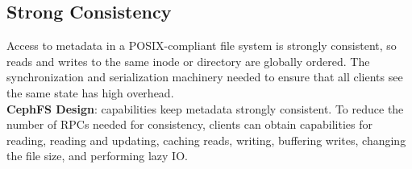 \subsection{Strong Consistency} 
\label{sec:strong-consistency}

Access to metadata in a POSIX-compliant file system is strongly consistent, so
reads and writes to the same inode or directory are globally ordered.  The
synchronization and serialization machinery needed to ensure that all clients
see the same state has high overhead.\\

\noindent\textbf{CephFS Design}: capabilities keep metadata strongly
consistent. To reduce the number of RPCs needed for consistency, clients can
obtain capabilities for reading, reading and updating, caching reads, writing,
buffering writes, changing the file size, and performing lazy IO.

